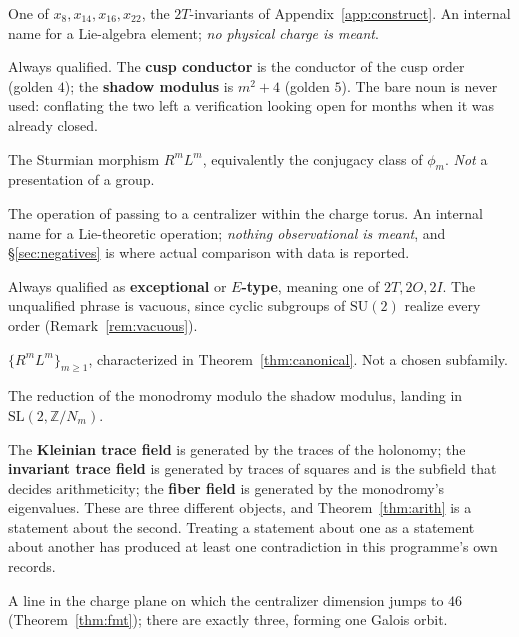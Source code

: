 \documentclass[11pt,reqno]{amsart}
\theoremstyle{plain}
\theoremstyle{definition}
\theoremstyle{remark}
\newcommand{\Z}{\mathbb{Z}}
\newcommand{\SL}{\mathrm{SL}}
\newcommand{\SU}{\mathrm{SU}}
\begin{document}
\begin{description}[leftmargin=0pt,style=nextline,itemsep=1pt]
\item[charge] One of $x_8,x_{14},x_{16},x_{22}$, the $2T$-invariants of
  Appendix~\ref{app:construct}. An internal name for a Lie-algebra element; \emph{no
  physical charge is meant}.
\item[conductor$^\dagger$] Always qualified. The \textbf{cusp conductor} is the
  conductor of the cusp order (golden $4$); the \textbf{shadow modulus} is
  $m^2+4$ (golden $5$). The bare noun is never used: conflating the two left a
  verification looking open for months when it was already closed.
\item[grammar] The Sturmian morphism $R^mL^m$, equivalently the conjugacy class of
  $\phi_m$. \emph{Not} a presentation of a group.
\item[measurement] The operation of passing to a centralizer within the charge torus.
  An internal name for a Lie-theoretic operation; \emph{nothing observational is
  meant}, and \S\ref{sec:negatives} is where actual comparison with data is reported.
\item[McKay group$^\dagger$] Always qualified as \textbf{exceptional} or
  \textbf{$E$-type}, meaning one of $2T,2O,2I$. The unqualified phrase is vacuous, since
  cyclic subgroups of $\SU(2)$ realize every order (Remark~\ref{rem:vacuous}).
\item[metallic family] $\{R^mL^m\}_{m\ge1}$, characterized in
  Theorem~\ref{thm:canonical}. Not a chosen subfamily.
\item[shadow] The reduction of the monodromy modulo the shadow modulus, landing in
  $\SL(2,\Z/N_m)$.
\item[trace field$^\dagger$] The \textbf{Kleinian trace field} is generated by the
  traces of the holonomy; the \textbf{invariant trace field} is generated by traces of
  squares and is the subfield that decides arithmeticity; the \textbf{fiber field} is
  generated by the monodromy's eigenvalues. These are three different objects, and
  Theorem~\ref{thm:arith} is a statement about the second. Treating a statement about
  one as a statement about another has produced at least one contradiction in this
  programme's own records.
\item[wall] A line in the charge plane on which the centralizer dimension jumps to $46$
  (Theorem~\ref{thm:fmt}); there are exactly three, forming one Galois orbit.
\end{description}
\end{document}

